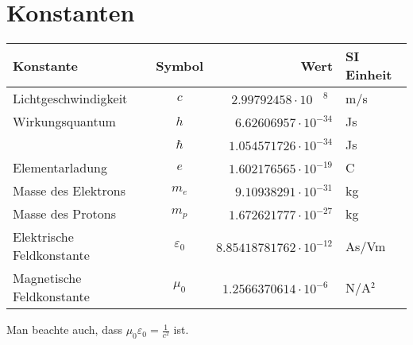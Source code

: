 \chapter{Konstanten\label{chapter:konstanten}}
\rhead{}
\begin{center}
\begin{tabular}{lcrl}
\hline
Konstante&Symbol&Wert&SI Einheit\\
\hline
Lichtgeschwindigkeit     &$c$            &$2.99792458\cdot 10^{\phantom{-}8\phantom{0}}$&m/s\\
Wirkungsquantum          &$h$            &$6.62606957\cdot 10^{-34}$   &Js\\
                         &$\hbar$        &$1.054571726\cdot 10^{-34}$  &Js\\
Elementarladung          &$e$            &$1.602176565\cdot 10^{-19}$  &C \\
Masse des Elektrons      &$m_e$          &$9.10938291\cdot 10^{-31}$   &kg\\
Masse des Protons        &$m_p$          &$1.672621777\cdot 10^{-27}$  &kg\\
Elektrische Feldkonstante&$\varepsilon_0$&$8.85418781762\cdot 10^{-12}$&As/Vm\\
Magnetische Feldkonstante&$\mu_0$        &$1.2566370614\cdot 10^{-6\phantom{0}}$  &N/A$\mathstrut^2$\\
\hline
\end{tabular}
\end{center}
Man beachte auch, dass $\displaystyle \mu_0\varepsilon_0=\frac1{c^2}$ ist.
